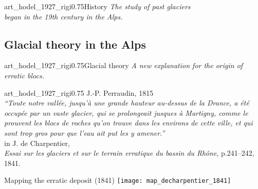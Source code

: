 
    \begin{sectionframe}{art_hodel_1927_rigi}{0.75}{History}
      \emph{The study of past glaciers\\\bigskip
            began in the 19th century in the Alps.}
    \end{sectionframe}


\subsection{Glacial theory in the Alps}

    \begin{sectionframe}{art_hodel_1927_rigi}{0.75}{Glacial theory}
      \emph{A new explanation for the origin of erratic blocs.}
    \end{sectionframe}


    \begin{backgroundframe}{art_hodel_1927_rigi}{0.75}{}
      J.-P. Perraudin, 1815\\
      \bigskip
      \emph{``Toute notre vallée, jusqu'à une grande hauteur au-dessus de la
              Drance, a été occupée par un vaste glacier, qui se prolongeait
              jusques à Martigny, comme le prouvent les blocs de roches qu'on
              trouve dans les environs de cette ville, et qui sont trop gros
              pour que l'eau ait put les y amener.''}\\
      \bigskip
      in J. de Charpentier,\\
      \emph{Essai sur les glaciers et sur le terrain erratique
            du bassin du Rhône},
      p.241--242, 1841.
    \end{backgroundframe}

    \begin{frame}{Mapping the erratic deposit (1841)}
      \texttt{[image: map\_decharpentier\_1841]}
    \end{frame}


